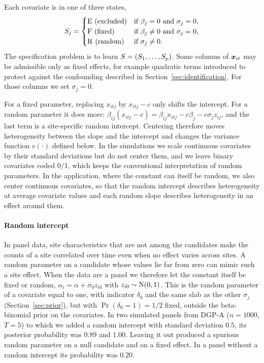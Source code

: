 Each covariate is in one of three states,
\begin{equation}\label{eq:states}
S_j=\begin{cases}
\mathrm{E}\ (\text{excluded}) & \text{if } \beta_j=0 \text{ and } \sigma_j=0,\\
\mathrm{F}\ (\text{fixed}) & \text{if } \beta_j\neq 0 \text{ and } \sigma_j=0,\\
\mathrm{R}\ (\text{random}) & \text{if } \sigma_j\neq 0 .
\end{cases}
\end{equation}
The specification problem is to learn $S=(S_1,\dots,S_p)$. Some columns of $\bm{x}_{it}$ may be admissible only as fixed effects, for example quadratic terms introduced to protect against the confounding described in Section~\ref{sec:identification}. For those columns we set $\sigma_j=0$.

\begin{remark}\label{rem:centering}
For a fixed parameter, replacing $x_{itj}$ by $x_{itj}-c$ only shifts the intercept. For a random parameter it does more: $\beta_{ij}(x_{itj}-c)=\beta_{ij}x_{itj}-c\beta_j-c\sigma_j z_{ij}$, and the last term is a site-specific random intercept. Centering therefore moves heterogeneity between the slope and the intercept and changes the variance function $v(\cdot)$ defined below. In the simulations we scale continuous covariates by their standard deviations but do not center them, and we leave binary covariates coded $0/1$, which keeps the conventional interpretation of random parameters. In the application, where the constant can itself be random, we also center continuous covariates, so that the random intercept describes heterogeneity at average covariate values and each random slope describes heterogeneity in an effect around them.
\end{remark}

\paragraph{Random intercept} In panel data, site characteristics that are not among the candidates make the counts of a site correlated over time even when no effect varies across sites. A random parameter on a candidate whose values lie far from zero can mimic such a site effect. When the data are a panel we therefore let the constant itself be fixed or random, $\alpha_i=\alpha+\sigma_0z_{i0}$ with $z_{i0}\sim\mathrm{N}(0,1)$. This is the random parameter of a covariate equal to one, with indicator $\delta_0$ and the same slab as the other $\sigma_j$ (Section~\ref{sec:prior}), but with $\Pr(\delta_0=1)=1/2$ fixed, outside the beta-binomial prior on the covariates. In two simulated panels from DGP-A ($n=1000$, $T=5$) to which we added a random intercept with standard deviation $0.5$, its posterior probability was $0.89$ and $1.00$. Leaving it out produced a spurious random parameter on a null candidate and on a fixed effect. In a panel without a random intercept its probability was $0.20$.

